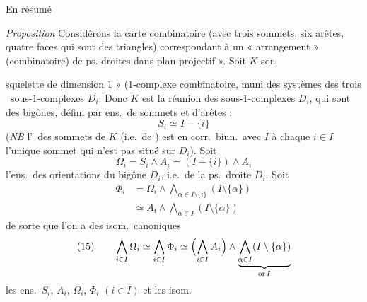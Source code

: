 \documentclass[11pt,a4paper]{article}
\begin{document}
En résumé

\emph{Proposition} Considérons la carte combinatoire \add{\ill{}} (avec trois sommets, six arêtes, quatre faces qui sont des triangles) correspondant à un « arrangement » (combinatoire) de   ps.-droites  dans  plan projectif ». Soit $K$ son

squelette de dimension $1$ » ($1$-complexe combinatoire, muni des systèmes des trois \ sous-$1$-complexes $D_i$. \struck{\ill{}} Donc $K$ est la réunion des sous-$1$-complexes $D_i$, qui sont des bigônes,  défini par   ens.\ de  sommets et d'arêtes  \struck{\ill{}} :
\struck{\ill{}}
\[
S_i \simeq I - \lbrace i \rbrace
\]
(\emph{NB} \struck{\ill{}} l'\ des sommets de $K$ (i.e.\ de ) est en corr.\ biun.\ avec $I$  à chaque $i \in I$ l'unique sommet qui n'est pas situé sur $D_i$). Soit
\[
\Omega_i = S_i \wedge A_i = (I - \lbrace i \rbrace) \wedge A_i
\]
l'ens.\ des orientations du bigône $D_i$, i.e.\ de la ps.\ droite $D_i$. Soit
\[
\begin{aligned}
\Phi_i &= \Omega_i \wedge \bigwedge_{\alpha \in I \setminus \lbrace i \rbrace} (I \setminus \lbrace \alpha \rbrace) \\
&\simeq A_i \wedge \bigwedge_{\alpha \in I} (I \setminus \lbrace \alpha \rbrace)
\end{aligned}
\]
de sorte que l'on a des isom.\ canoniques
\[
(15) \qquad \bigwedge_{i \in I} \Omega_i \simeq \bigwedge_{i \in I} \Phi_i \simeq \Bigl(\bigwedge_{i \in I} A_i\Bigr) \wedge \underbrace{\bigwedge_{\alpha \in I} (I \setminus \lbrace \alpha \rbrace)}_{\operatorname{or} I}
\]
les ens.\ $S_i$, $A_i$, $\Omega_i$, $\Phi_i$ $(i \in I)$ et les isom.
\end{document}
